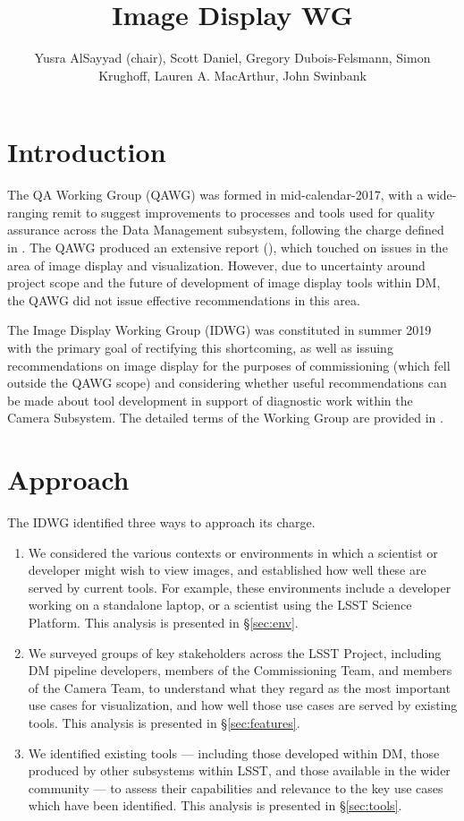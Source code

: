 \documentclass[DM,authoryear,toc]{lsstdoc}
\title{Image Display WG}
\author{%
Yusra AlSayyad (chair),
Scott Daniel,
Gregory Dubois-Felsmann,
Simon Krughoff,
Lauren A. MacArthur,
John Swinbank
}
\date{\vcsDate}
\begin{document}
\maketitle

\section{Introduction}

The QA Working Group (QAWG) was formed in mid-calendar-2017, with a wide-ranging remit to suggest improvements to processes and tools used for quality assurance across the Data Management subsystem, following the charge defined in .
The QAWG produced an extensive report (), which touched on issues in the area of image display and visualization.
However, due to uncertainty around project scope and the future of development of image display tools within DM, the QAWG did not issue effective recommendations in this area.

The Image Display Working Group (IDWG) was constituted in summer 2019 with the primary goal of rectifying this shortcoming, as well as issuing recommendations on image display for the purposes of commissioning (which fell outside the QAWG scope) and considering whether useful recommendations can be made about tool development in support of diagnostic work within the Camera Subsystem.
The detailed terms of the Working Group are provided in .

\section{Approach}

The IDWG identified three ways to approach its charge.

\begin{enumerate}

  \item{
    We considered the various contexts or environments in which a scientist or developer might wish to view images, and established how well these are served by current tools.
    For example, these environments include a developer working on a standalone laptop, or a scientist using the LSST Science Platform.
    This analysis is presented in \S\ref{sec:env}.
  }

  \item{
    We surveyed groups of key stakeholders across the LSST Project, including DM pipeline developers, members of the Commissioning Team, and members of the Camera Team, to understand what they regard as the most important use cases for visualization, and how well those use cases are served by existing tools.
    This analysis is presented in \S\ref{sec:features}.
  }

  \item{
    We identified existing tools --- including those developed within DM, those produced by other subsystems within LSST, and those available in the wider community --- to assess their capabilities and relevance to the key use cases which have been identified.
    This analysis is presented in \S\ref{sec:tools}.
  }

\end{enumerate}
\end{document}
